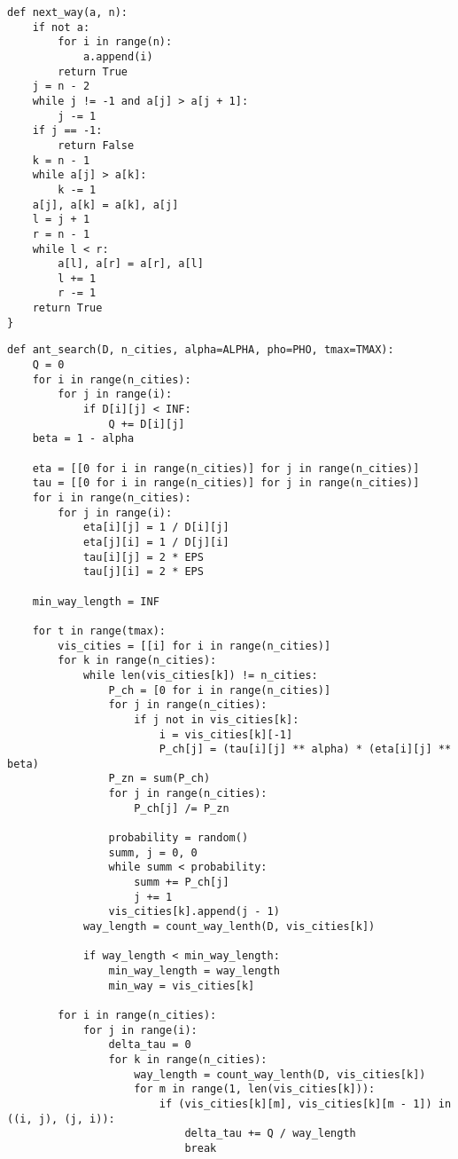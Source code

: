\begin{lstlisting}[caption=Реализация алгоритма полного перебора (генератор маршрутов), 
    label={full-gen}]
def next_way(a, n):
    if not a:
        for i in range(n):
            a.append(i)
        return True
    j = n - 2
    while j != -1 and a[j] > a[j + 1]:
        j -= 1
    if j == -1:
        return False
    k = n - 1
    while a[j] > a[k]:
        k -= 1
    a[j], a[k] = a[k], a[j]
    l = j + 1
    r = n - 1
    while l < r:
        a[l], a[r] = a[r], a[l]
        l += 1
        r -= 1
    return True
}
\end{lstlisting}

\begin{lstlisting}[caption=Реализация муравьиного алгоритма, 
    label={ant}]
def ant_search(D, n_cities, alpha=ALPHA, pho=PHO, tmax=TMAX):
    Q = 0
    for i in range(n_cities):
        for j in range(i):
            if D[i][j] < INF:
                Q += D[i][j]
    beta = 1 - alpha

    eta = [[0 for i in range(n_cities)] for j in range(n_cities)]
    tau = [[0 for i in range(n_cities)] for j in range(n_cities)]
    for i in range(n_cities):
        for j in range(i):
            eta[i][j] = 1 / D[i][j]
            eta[j][i] = 1 / D[j][i]
            tau[i][j] = 2 * EPS
            tau[j][i] = 2 * EPS

    min_way_length = INF

    for t in range(tmax):
        vis_cities = [[i] for i in range(n_cities)]
        for k in range(n_cities):
            while len(vis_cities[k]) != n_cities:
                P_ch = [0 for i in range(n_cities)]
                for j in range(n_cities):
                    if j not in vis_cities[k]:
                        i = vis_cities[k][-1]
                        P_ch[j] = (tau[i][j] ** alpha) * (eta[i][j] ** beta)
                P_zn = sum(P_ch)
                for j in range(n_cities):
                    P_ch[j] /= P_zn
                    
                probability = random()
                summ, j = 0, 0
                while summ < probability:
                    summ += P_ch[j]
                    j += 1
                vis_cities[k].append(j - 1)
            way_length = count_way_lenth(D, vis_cities[k])
            
            if way_length < min_way_length:
                min_way_length = way_length
                min_way = vis_cities[k]

        for i in range(n_cities):
            for j in range(i):
                delta_tau = 0
                for k in range(n_cities):
                    way_length = count_way_lenth(D, vis_cities[k])
                    for m in range(1, len(vis_cities[k])):
                        if (vis_cities[k][m], vis_cities[k][m - 1]) in ((i, j), (j, i)):
                            delta_tau += Q / way_length
                            break
                            

\end{lstlisting}
